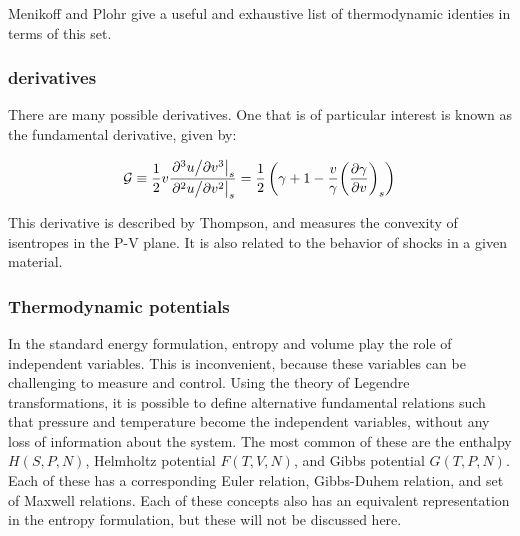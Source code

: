 \documentclass[twocolumn,10pt]{asme2ej}
\begin{document}
Menikoff and Plohr\cite{RN819} give a useful and exhaustive list of thermodynamic identies in terms of this set. 

\subsubsection{ derivatives}
There are many possible  derivatives. One that is of particular interest is known as the fundamental derivative, given by\cite{RN819}:

\[{\cal G} \equiv \frac{1}{2}v\frac{{{{\left. {{{{\partial ^3}u} \mathord{\left/
 {\vphantom {{{\partial ^3}u} {\partial {v^3}}}} \right.
 \kern-\nulldelimiterspace} {\partial {v^3}}}} \right|}_s}}}{{{{\left. {{{{\partial ^2}u} \mathord{\left/
 {\vphantom {{{\partial ^2}u} {\partial {v^2}}}} \right.
 \kern-\nulldelimiterspace} {\partial {v^2}}}} \right|}_s}}} = \frac{1}{2}\left( {\gamma  + 1 - \frac{v}{\gamma }{{\left( {\frac{{\partial \gamma }}{{\partial v}}} \right)}_s}} \right)\]

This derivative is described by Thompson\cite{RN1017}, and measures the convexity of isentropes in the P-V plane. It is also related to the behavior of shocks in a given material.

\subsubsection{Thermodynamic potentials}
In the standard energy formulation, entropy and volume play the role of independent variables. This is inconvenient, because these variables can be challenging to measure and control. Using the theory of Legendre transformations, it is possible to define alternative fundamental relations such that pressure and temperature become the independent variables, without any loss of information about the system. The most common of these are the enthalpy $H\left(S, P, N\right)$, Helmholtz potential $F\left(T, V, N\right)$, and Gibbs potential $G\left(T, P, N\right)$. Each of these has a corresponding Euler relation, Gibbs-Duhem relation, and set of Maxwell relations. Each of these concepts also has an equivalent representation in the entropy formulation, but these will not be discussed here. 
\end{document}
